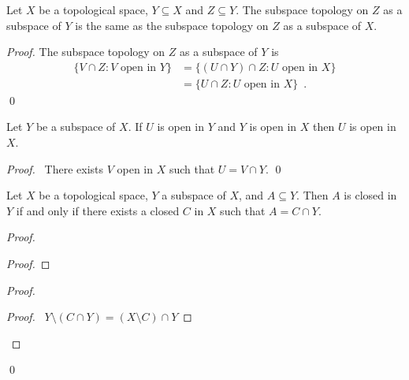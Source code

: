 \begin{prop}
  Let $X$ be a topological space, $Y \subseteq X$ and $Z \subseteq Y$. The subspace topology on $Z$ as a subspace of $Y$ is the same as the subspace topology on $Z$ as a subspace of $X$.
\end{prop}

\begin{proof}
  \pf
  The subspace topology on $Z$ as a subspace of $Y$ is
  \begin{align*}
    \{ V \cap Z : V \text{ open in } Y \} & = \{ (U \cap Y) \cap Z : U \text{ open in } X \} \\
    & = \{ U \cap Z : U \text{ open in } X \} \enspace .
  \end{align*}
  \qed
\end{proof}

\begin{prop}
  \label{prop:subspace:open}
  Let $Y$ be a subspace of $X$. If $U$ is open in $Y$ and $Y$ is open in $X$ then $U$ is open in $X$.
\end{prop}

\begin{proof}
  \pf\ There exists $V$ open in $X$ such that $U = V \cap Y$. \qed
\end{proof}

\begin{prop}
  \label{prop:subspace:closed}
  Let $X$ be a topological space, $Y$ a subspace of $X$, and $A \subseteq Y$. Then $A$ is closed in $Y$ if and only if there exists a closed $C$ in $X$ such that $A = C \cap Y$.
\end{prop}

\begin{proof}
  \pf
  \begin{proof}
  \end{proof}
  \begin{proof}
    \begin{proof}
      \pf\ $Y \setminus (C \cap Y) = (X \setminus C) \cap Y$
    \end{proof}
  \end{proof}
  \qed
\end{proof}

